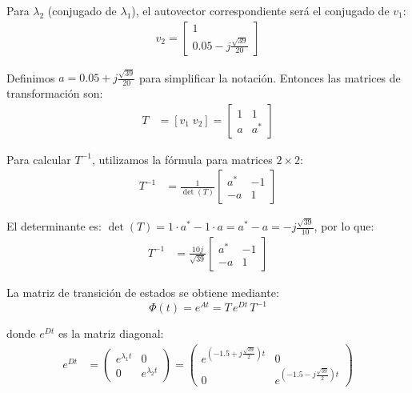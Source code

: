 \documentclass[
  11pt,
  letterpaper,
   addpoints,
   answers
  ]{exam}
\begin{document}
\begin{solution}
Para $\lambda_2$ (conjugado de $\lambda_1$), el autovector correspondiente será el conjugado de $v_1$:
\begin{align}
v_2 = \begin{bmatrix} 1 \\ 0.05 - j\frac{\sqrt{39}}{20} \end{bmatrix}
\end{align}

Definimos $a = 0.05 + j\frac{\sqrt{39}}{20}$ para simplificar la notación. Entonces las matrices de transformación son:
\begin{align}
T &= [v_1 \; v_2] = \begin{bmatrix} 1 & 1 \\ a & a^* \end{bmatrix}
\end{align}

Para calcular $T^{-1}$, utilizamos la fórmula para matrices $2 \times 2$:
\begin{align}
T^{-1} &= \frac{1}{\det(T)} \begin{bmatrix} a^* & -1 \\ -a & 1 \end{bmatrix}
\end{align}

El determinante es: $\det(T) = 1 \cdot a^* - 1 \cdot a = a^* - a = -j\frac{\sqrt{39}}{10}$, por lo que:
\begin{align}
T^{-1} &= \frac{10j}{\sqrt{39}} \begin{bmatrix} a^* & -1 \\ -a & 1 \end{bmatrix}
\end{align}

La matriz de transición de estados se obtiene mediante:
\begin{equation}
\Phi(t) = e^{At} = T\,e^{Dt}\,T^{-1}
\end{equation}

donde $e^{Dt}$ es la matriz diagonal:
\begin{align}
  e^{Dt} &= \begin{pmatrix} e^{\lambda_1 t} & 0 \\ 0 & e^{\lambda_2 t} \end{pmatrix} = \begin{pmatrix} e^{(-1.5 + j\frac{\sqrt{39}}{2})t} & 0 \\ 0 & e^{(-1.5 - j\frac{\sqrt{39}}{2})t} \end{pmatrix}
\end{align}


\end{solution}
\end{document}
